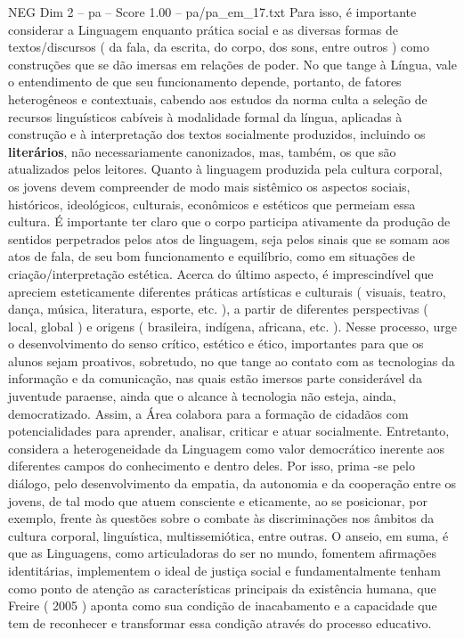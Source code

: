 \begin{textsample}{NEG Dim 2 – pa – Score 1.00 – pa/pa\_em\_17.txt}  \label{ex:f2_neg_230}
Para isso, é importante considerar a Linguagem enquanto prática social e as diversas formas de textos/discursos ( da fala, da escrita, do corpo, dos sons, entre outros ) como construções que se dão imersas em relações de poder.
No que tange à Língua, vale o entendimento de que seu funcionamento depende, portanto, de fatores heterogêneos e contextuais, cabendo aos estudos da norma culta a seleção de recursos linguísticos cabíveis à modalidade formal da língua, aplicadas à construção e à interpretação dos textos socialmente produzidos, incluindo os \textbf{literários}, não necessariamente canonizados, mas, também, os que são atualizados pelos leitores.
Quanto à linguagem produzida pela cultura corporal, os jovens devem compreender de modo mais sistêmico os aspectos sociais, históricos, ideológicos, culturais, econômicos e estéticos que permeiam essa cultura.
É importante ter claro que o corpo participa ativamente da produção de sentidos perpetrados pelos atos de linguagem, seja pelos sinais que se somam aos atos de fala, de seu bom funcionamento e equilíbrio, como em situações de criação/interpretação estética.
Acerca do último aspecto, é imprescindível que apreciem esteticamente diferentes práticas artísticas e culturais ( visuais, teatro, dança, música, literatura, esporte, etc. ), a partir de diferentes perspectivas ( local, global ) e origens ( brasileira, indígena, africana, etc. ).
Nesse processo, urge o desenvolvimento do senso crítico, estético e ético, importantes para que os alunos sejam proativos, sobretudo, no que tange ao contato com as tecnologias da informação e da comunicação, nas quais estão imersos parte considerável da juventude paraense, ainda que o alcance à tecnologia não esteja, ainda, democratizado.
Assim, a Área colabora para a formação de cidadãos com potencialidades para aprender, analisar, criticar e atuar socialmente.
Entretanto, considera a heterogeneidade da Linguagem como valor democrático inerente aos diferentes campos do conhecimento e dentro deles.
Por isso, prima -se pelo diálogo, pelo desenvolvimento da empatia, da autonomia e da cooperação entre os jovens, de tal modo que atuem consciente e eticamente, ao se posicionar, por exemplo, frente às questões sobre o combate às discriminações nos âmbitos da cultura corporal, linguística, multissemiótica, entre outras.
O anseio, em suma, é que as Linguagens, como articuladoras do ser no mundo, fomentem afirmações identitárias, implementem o ideal de justiça social e fundamentalmente tenham como ponto de atenção as características principais da existência humana, que Freire ( 2005 ) aponta como sua condição de inacabamento e a capacidade que tem de reconhecer e transformar essa condição através do processo educativo.

\end{textsample}
